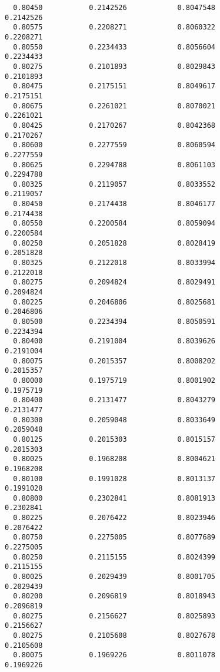 \documentclass[
  letterpaper,
  DIV=11,
  numbers=noendperiod]{scrartcl}
\begin{document}
\begin{verbatim}
  0.80450           0.2142526            0.8047548            0.2142526     
  0.80575           0.2208271            0.8060322            0.2208271     
  0.80550           0.2234433            0.8056604            0.2234433     
  0.80275           0.2101893            0.8029843            0.2101893     
  0.80475           0.2175151            0.8049617            0.2175151     
  0.80675           0.2261021            0.8070021            0.2261021     
  0.80425           0.2170267            0.8042368            0.2170267     
  0.80600           0.2277559            0.8060594            0.2277559     
  0.80625           0.2294788            0.8061103            0.2294788     
  0.80325           0.2119057            0.8033552            0.2119057     
  0.80450           0.2174438            0.8046177            0.2174438     
  0.80550           0.2200584            0.8059094            0.2200584     
  0.80250           0.2051828            0.8028419            0.2051828     
  0.80325           0.2122018            0.8033994            0.2122018     
  0.80275           0.2094824            0.8029491            0.2094824     
  0.80225           0.2046806            0.8025681            0.2046806     
  0.80500           0.2234394            0.8050591            0.2234394     
  0.80400           0.2191004            0.8039626            0.2191004     
  0.80075           0.2015357            0.8008202            0.2015357     
  0.80000           0.1975719            0.8001902            0.1975719     
  0.80400           0.2131477            0.8043279            0.2131477     
  0.80300           0.2059048            0.8033649            0.2059048     
  0.80125           0.2015303            0.8015157            0.2015303     
  0.80025           0.1968208            0.8004621            0.1968208     
  0.80100           0.1991028            0.8013137            0.1991028     
  0.80800           0.2302841            0.8081913            0.2302841     
  0.80225           0.2076422            0.8023946            0.2076422     
  0.80750           0.2275005            0.8077689            0.2275005     
  0.80250           0.2115155            0.8024399            0.2115155     
  0.80025           0.2029439            0.8001705            0.2029439     
  0.80200           0.2096819            0.8018943            0.2096819     
  0.80275           0.2156627            0.8025893            0.2156627     
  0.80275           0.2105608            0.8027678            0.2105608     
  0.80075           0.1969226            0.8011078            0.1969226     

\end{verbatim}
\end{document}
